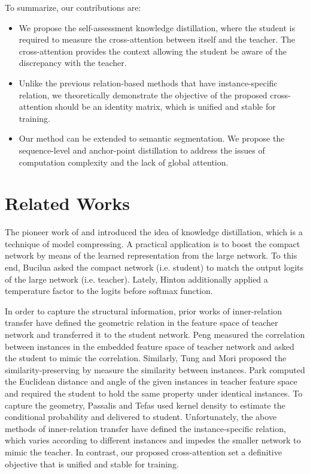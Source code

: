 \documentclass[10pt,twocolumn,letterpaper]{article}
\begin{document}
To summarize, our contributions are:
\begin{itemize}
    \item We propose the self-assessment knowledge distillation, where the student is required to measure the cross-attention between itself and the teacher. The cross-attention provides the context allowing the student be aware of the discrepancy with the teacher.
    \item Unlike the previous relation-based methods that have instance-specific relation, we theoretically demonstrate the objective of the proposed cross-attention should be an identity matrix, which is unified and stable for training.
    \item Our method can be extended to semantic segmentation. We propose the sequence-level and anchor-point distillation to address the issues of computation complexity and the lack of global attention.
\end{itemize}

\section{Related Works}
The pioneer work of \cite{bucilua2006model} and \cite{Hinton2015DistillingTK} introduced the idea of knowledge distillation, which is a technique of model compressing. A practical application is to boost the compact network by means of the learned representation from the large network. To this end, Bucilua \etal \cite{bucilua2006model} asked the compact network (i.e. student) to match the output logits of the large network (i.e. teacher). Lately, Hinton \etal \cite{Hinton2015DistillingTK} additionally applied a temperature factor to the logits before softmax function. 

In order to capture the structural information, prior works \cite{Park2019RelationalKD, Passalis2018LearningDR,Peng2019CorrelationCF,Tung2019SimilarityPreservingKD} of inner-relation transfer have defined the geometric relation in the feature space of teacher network and transferred it to the student network. Peng \etal \cite{Peng2019CorrelationCF} measured the correlation between instances in the embedded feature space of teacher network and asked the student to mimic the correlation. Similarly, Tung and Mori proposed the similarity-preserving by measure the similarity between instances. Park \etal \cite{Park2019RelationalKD} computed the Euclidean distance and angle of the given instances in teacher feature space and required the student to hold the same property under identical instances. To capture the geometry, Passalis and Tefas \cite{Passalis2018LearningDR} used kernel density to estimate the conditional probability and delivered to student. Unfortunately, the above methods of inner-relation transfer have defined the instance-specific relation, which varies according to different instances and impedes the smaller network to mimic the teacher. In contrast, our proposed cross-attention set a definitive objective that is unified and stable for training.  
\end{document}
